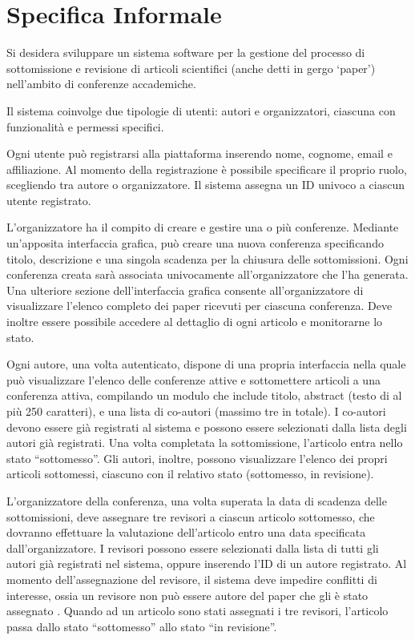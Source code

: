 \chapter{Specifica Informale}
\label{sec:informal}
Si desidera sviluppare un sistema software per la gestione del
processo di sottomissione e revisione di articoli scientifici (anche
detti in gergo ‘paper’) nell’ambito di conferenze accademiche.
\bigskip

Il sistema coinvolge due tipologie di utenti: autori e organizzatori,
ciascuna con funzionalità e permessi specifici.
\bigskip

Ogni utente può registrarsi alla piattaforma inserendo nome, cognome,
email e affiliazione. Al momento della registrazione è possibile
specificare il proprio ruolo, scegliendo tra autore o
organizzatore. Il sistema assegna un ID univoco a ciascun utente
registrato.
\bigskip

L’organizzatore ha il compito di creare e gestire una o più
conferenze. Mediante un’apposita interfaccia grafica, può creare una
nuova conferenza specificando titolo, descrizione e una singola
scadenza per la chiusura delle sottomissioni. Ogni conferenza creata
sarà associata univocamente all’organizzatore che l’ha generata. Una
ulteriore sezione dell’interfaccia grafica consente all’organizzatore
di visualizzare l’elenco completo dei paper ricevuti per ciascuna
conferenza. Deve inoltre essere possibile accedere al dettaglio di
ogni articolo e monitorarne lo stato.
\bigskip

Ogni autore, una volta autenticato, dispone di una propria interfaccia
nella quale può visualizzare l’elenco delle conferenze attive e
sottomettere articoli a una conferenza attiva, compilando un modulo
che include titolo, abstract (testo di al più 250 caratteri), e una
lista di co-autori (massimo tre in totale). I co-autori devono essere
già registrati al sistema e possono essere selezionati dalla lista
degli autori già registrati. Una volta completata la sottomissione,
l’articolo entra nello stato “sottomesso”. Gli autori, inoltre,
possono visualizzare l’elenco dei propri articoli sottomessi, ciascuno
con il relativo stato (sottomesso, in revisione).
\bigskip

L’organizzatore della conferenza, una volta superata la data di
scadenza delle sottomissioni, deve assegnare tre revisori a ciascun
articolo sottomesso, che dovranno effettuare la valutazione
dell’articolo entro una data specificata dall’organizzatore. I
revisori possono essere selezionati dalla lista di tutti gli autori
già registrati nel sistema, oppure inserendo l’ID di un autore
registrato. Al momento dell’assegnazione del revisore, il sistema deve
impedire conflitti di interesse, ossia un revisore non può essere
autore del paper che gli è stato assegnato . Quando ad un articolo
sono stati assegnati i tre revisori, l’articolo passa dallo stato
“sottomesso” allo stato “in revisione”.
\bigskip

